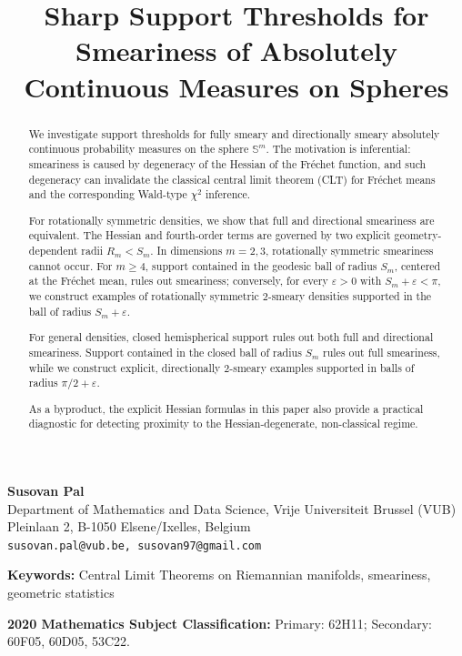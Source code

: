 \documentclass{amsart}
\theoremstyle{definition}
\theoremstyle{remark}
\newcommand\0{\boldsymbol{0}}
\begin{document}

\title{Sharp Support Thresholds for Smeariness of Absolutely Continuous Measures on Spheres}
\vspace{-8mm}
\maketitle
\begin{center}
  \textbf{Susovan Pal} \\
  Department of Mathematics and Data Science, Vrije Universiteit Brussel (VUB) \\
  Pleinlaan 2, B-1050 Elsene/Ixelles, Belgium \\
  \texttt{susovan.pal@vub.be, susovan97@gmail.com}

\end{center}

\noindent\textbf{Keywords:} Central Limit Theorems on Riemannian manifolds, smeariness, geometric statistics

\noindent\textbf{2020 Mathematics Subject Classification:}
Primary: 62H11; Secondary: 60F05, 60D05, 53C22.

\tableofcontents

\begin{abstract}
We investigate support thresholds for fully smeary and directionally smeary absolutely continuous probability measures on the sphere \(\mathbb{S}^m\). The motivation is inferential: smeariness is caused by degeneracy of the Hessian of the Fr\'echet function, and such degeneracy can invalidate the classical central limit theorem (CLT) for Fr\'echet means and the corresponding Wald-type \(\chi^2\) inference.

For rotationally symmetric densities, we show that full and directional smeariness are equivalent. The Hessian and fourth-order terms are governed by two explicit geometry-dependent radii \(R_m<S_m\). In dimensions \(m=2,3\), rotationally symmetric smeariness cannot occur. For \(m\ge4\), support contained in the geodesic ball of radius \(S_m\), centered at the Fr\'echet mean, rules out smeariness; conversely, for every \(\varepsilon>0\) with \(S_m+\varepsilon<\pi\), we construct examples of rotationally symmetric \(2\)-smeary densities supported in the ball of radius \(S_m+\varepsilon\).

For general densities, closed hemispherical support rules out both full and directional smeariness. Support contained in the closed ball of radius \(S_m\) rules out full smeariness, while we construct explicit, directionally \(2\)-smeary examples supported in balls of radius \(\pi/2+\varepsilon\).

As a byproduct, the explicit Hessian formulas in this paper also provide a practical diagnostic for detecting proximity to the Hessian-degenerate, non-classical regime.
\end{abstract}
\end{document}
